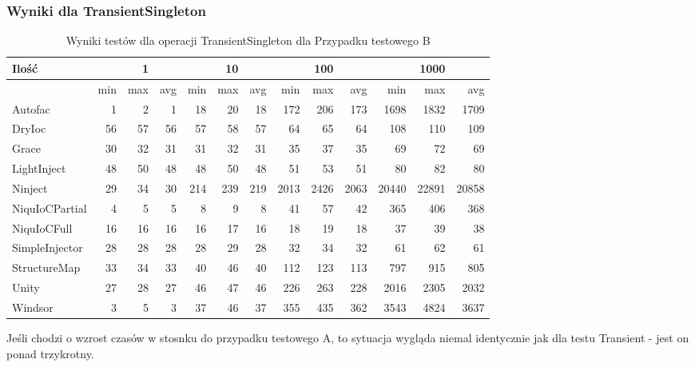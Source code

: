 \documentclass[12pt]{article}
\begin{document}
\subsubsection{Wyniki dla TransientSingleton}
\begin{table}[H]
\captionsetup{belowskip=0pt,aboveskip=0pt}
\begin{center}
\begin{small}
	\begin{tabular}{ | l | r r r | r r r | r r r | r r r | }
    		\hline
Ilość & & 1 & & & 10 & & & 100 & & & 1000 & \\ \hline
 & min & max & avg & min & max & avg & min & max & avg & min & max & avg \\ \hline
Autofac & 1 & 2 & 1 & 18 & 20 & 18 & 172 & 206 & 173 & 1698 & 1832 & 1709 \\ \hline
DryIoc & 56 & 57 & 56 & 57 & 58 & 57 & 64 & 65 & 64 & 108 & 110 & 109 \\ \hline
Grace & 30 & 32 & 31 & 31 & 32 & 31 & 35 & 37 & 35 & 69 & 72 & 69 \\ \hline
LightInject & 48 & 50 & 48 & 48 & 50 & 48 & 51 & 53 & 51 & 80 & 82 & 80 \\ \hline
Ninject & 29 & 34 & 30 & 214 & 239 & 219 & 2013 & 2426 & 2063 & 20440 & 22891 & 20858 \\ \hline
NiquIoCPartial & 4 & 5 & 5 & 8 & 9 & 8 & 41 & 57 & 42 & 365 & 406 & 368 \\ \hline
NiquIoCFull & 16 & 16 & 16 & 16 & 17 & 16 & 18 & 19 & 18 & 37 & 39 & 38 \\ \hline
SimpleInjector & 28 & 28 & 28 & 28 & 29 & 28 & 32 & 34 & 32 & 61 & 62 & 61 \\ \hline
StructureMap & 33 & 34 & 33 & 40 & 46 & 40 & 112 & 123 & 113 & 797 & 915 & 805 \\ \hline
Unity & 27 & 28 & 27 & 46 & 47 & 46 & 226 & 263 & 228 & 2016 & 2305 & 2032 \\ \hline
Windsor & 3 & 5 & 3 & 37 & 46 & 37 & 355 & 435 & 362 & 3543 & 4824 & 3637 \\ \hline
  	\end{tabular}
\end{small}
\end{center}
\caption{Wyniki testów dla operacji TransientSingleton dla Przypadku testowego B}
\label{TestCaseB_TransientSingleton}
\end{table}
Jeśli chodzi o wzrost czasów w stosnku do przypadku testowego A, to sytuacja wygląda niemal identycznie jak dla testu Transient - jest on ponad trzykrotny.\\
\end{document}
